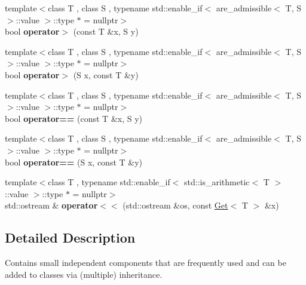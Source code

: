 \begin{DoxyCompactItemize}
\item 
{\footnotesize template$<$class T , class S , typename std\+::enable\+\_\+if$<$ are\+\_\+admissible$<$ T, S $>$\+::value $>$\+::type $\ast$  = nullptr$>$ }\\bool {\bfseries operator$>$} (const T \&x, S y)\hypertarget{namespaceSpacy_1_1Mixin_abe5de2f3edea6bb8b9161fedf09f4573}{}\label{namespaceSpacy_1_1Mixin_abe5de2f3edea6bb8b9161fedf09f4573}

\item 
{\footnotesize template$<$class T , class S , typename std\+::enable\+\_\+if$<$ are\+\_\+admissible$<$ T, S $>$\+::value $>$\+::type $\ast$  = nullptr$>$ }\\bool {\bfseries operator$>$} (S x, const T \&y)\hypertarget{namespaceSpacy_1_1Mixin_a06cafb92b3ba700b94a397b212d01837}{}\label{namespaceSpacy_1_1Mixin_a06cafb92b3ba700b94a397b212d01837}

\item 
{\footnotesize template$<$class T , class S , typename std\+::enable\+\_\+if$<$ are\+\_\+admissible$<$ T, S $>$\+::value $>$\+::type $\ast$  = nullptr$>$ }\\bool {\bfseries operator==} (const T \&x, S y)\hypertarget{namespaceSpacy_1_1Mixin_a15ddbc2afbe2bcb2b8bf4b9a73b57e6e}{}\label{namespaceSpacy_1_1Mixin_a15ddbc2afbe2bcb2b8bf4b9a73b57e6e}

\item 
{\footnotesize template$<$class T , class S , typename std\+::enable\+\_\+if$<$ are\+\_\+admissible$<$ T, S $>$\+::value $>$\+::type $\ast$  = nullptr$>$ }\\bool {\bfseries operator==} (S x, const T \&y)\hypertarget{namespaceSpacy_1_1Mixin_aba4049765948959a68991d99cc03d070}{}\label{namespaceSpacy_1_1Mixin_aba4049765948959a68991d99cc03d070}

\item 
{\footnotesize template$<$class T , typename std\+::enable\+\_\+if$<$ std\+::is\+\_\+arithmetic$<$ T $>$\+::value $>$\+::type $\ast$  = nullptr$>$ }\\std\+::ostream \& {\bfseries operator$<$$<$} (std\+::ostream \&os, const \hyperlink{classSpacy_1_1Mixin_1_1Get}{Get}$<$ T $>$ \&x)\hypertarget{namespaceSpacy_1_1Mixin_a616a1dc41131de436dc2459ab6336375}{}\label{namespaceSpacy_1_1Mixin_a616a1dc41131de436dc2459ab6336375}

\end{DoxyCompactItemize}


\subsection{Detailed Description}
Contains small independent components that are frequently used and can be added to classes via (multiple) inheritance. 

